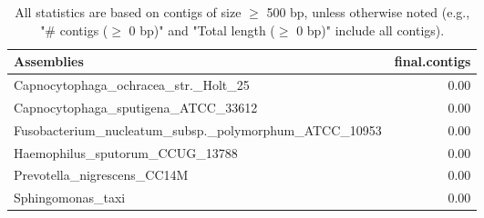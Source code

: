 \documentclass[12pt,a4paper]{article}
\begin{document}
\begin{table}[ht]
\begin{center}
\caption{All statistics are based on contigs of size $\geq$ 500 bp, unless otherwise noted (e.g., "\# contigs ($\geq$ 0 bp)" and "Total length ($\geq$ 0 bp)" include all contigs).}
\begin{tabular}{|l*{1}{|r}|}
\hline
Assemblies & final.contigs \\ \hline
Capnocytophaga\_ochracea\_str.\_Holt\_25 & 0.00 \\ \hline
Capnocytophaga\_sputigena\_ATCC\_33612 & 0.00 \\ \hline
Fusobacterium\_nucleatum\_subsp.\_polymorphum\_ATCC\_10953 & 0.00 \\ \hline
Haemophilus\_sputorum\_CCUG\_13788 & 0.00 \\ \hline
Prevotella\_nigrescens\_CC14M & 0.00 \\ \hline
Sphingomonas\_taxi & 0.00 \\ \hline
\end{tabular}
\end{center}
\end{table}
\end{document}
